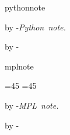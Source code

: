 
\newenvironment{question}{\begin{quotation}\textbf{Question.\ }}{\end{quotation}}
\newenvironment{example}{\begin{quotation}\textbf{Example.\ }}{\end{quotation}}
\newenvironment{specialnote}[1]
               {\par\begin{raggedright}
                 \leftskip=.5\unitindent
                 \noindent\textsl{#1.}\kern1em\ignorespaces}
               {\end{raggedright}\par}
\newenvironment{fortrannote}
  {\begin{specialnote}{Fortran note}}
  {\end{specialnote}}
\makeindex[name=python]
\argcomment
    {pythonnote}
    {\par\advance\leftskip by \unitindent
      \index[python]{\CommentArg}%
      \noindent \hbox{\kern-\unitindent \textsl{Python note.}}\ %
    }
    {\par\advance\leftskip by -\unitindent\relax}

\newenvironment{taccnote}
  {\begin{specialnote}{TACC note}}
  {\end{specialnote}}
\makeindex[name=mpl]

\argcomment
    {mplnote}
    {
      {=45 =45
        \edef\tmp{\lowercase{\gdef\noexpand\CommentArg{\CommentArg}}}\tmp}
      \def\CommentCutFile{snippets/mplnote-\CommentArg.cut}
      \par\advance\leftskip by \unitindent
      \index[mpl]{\CommentArg}%
      \noindent \hbox{\kern-\unitindent \textsl{MPL note.}}\ %
    }
    {\par\advance\leftskip by -\unitindent\relax}

